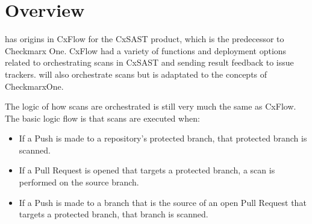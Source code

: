 \chapter{Overview}\label{sec:overview}

\cxoneflow has origins in CxFlow for the CxSAST product, which is the predecessor to Checkmarx One.  CxFlow
had a variety of functions and deployment options related to orchestrating scans in CxSAST and sending
result feedback to issue trackers.  \cxoneflow will also orchestrate scans but is adaptated to the
concepts of CheckmarxOne.

The \cxoneflow logic of how scans are orchestrated is still very much the same as CxFlow.  The basic
logic flow is that scans are executed when:

\begin{itemize}
    \item If a Push is made to a repository's protected branch, that protected branch is scanned.
    \item If a Pull Request is opened that targets a protected branch, a scan is performed on
    the source branch.
    \item If a Push is made to a branch that is the source of an open Pull Request that targets
    a protected branch, that branch is scanned.
\end{itemize}

